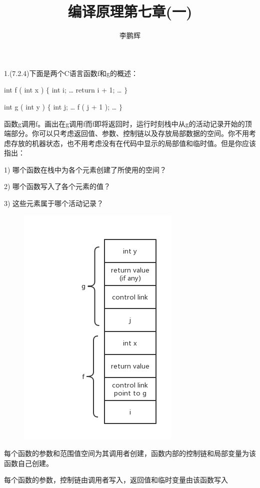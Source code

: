 \documentclass[a4paper, 16pt]{article}
\title{编译原理第七章(一)}
\author{李鹏辉}
\begin{document}
\maketitle

1.(7.2.4)下面是两个C语言函数f和g的概述：

int f ( int x ) $\{$ int i; … return i + 1; … $\}$

int g ( int y ) $\{$ int j; … f ( j + 1 ); … $\}$

函数g调用f。画出在g调用f而f即将返回时，运行时刻栈中从g的活动记录开始的顶端部分。你可以只考虑返回值、参数、控制链以及存放局部数据的空间。你不用考虑存放的机器状态，也不用考虑没有在代码中显示的局部值和临时值。但是你应该指出：

1) 哪个函数在栈中为各个元素创建了所使用的空间？

2) 哪个函数写入了各个元素的值？ 

3) 这些元素属于哪个活动记录？

\begin{figure}[H]
\centering
\includegraphics[scale = 0.6]{chapter7_1}
\label{f1}
\end{figure}

每个函数的参数和范围值空间为其调用者创建，函数内部的控制链和局部变量为该函数自己创建。

每个函数的参数，控制链由调用者写入，返回值和临时变量由该函数写入\\
\end{document}
